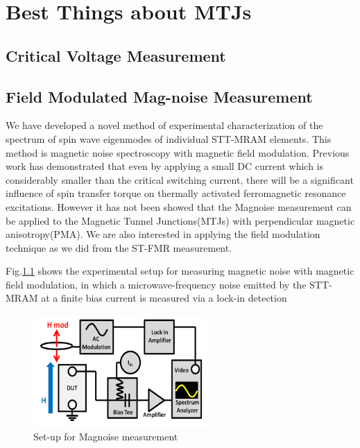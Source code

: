 \chapter{Best Things about MTJs}


\section{Critical Voltage Measurement}




\section{Field Modulated Mag-noise Measurement}



We have developed a novel method of experimental characterization of the spectrum of spin wave eigenmodes of individual STT-MRAM elements. This method is magnetic noise spectroscopy with magnetic field modulation. Previous work\cite{MagnoisePRL}\cite{Magnoise} has demonstrated that even by applying a small DC current which is considerably smaller than the critical switching current, there will be a significant influence of spin transfer torque on thermally activated ferromagnetic resonance excitations. However it has not been showed that the Magnoise measurement can be applied to the Magnetic Tunnel Junctions(MTJs) with perpendicular magnetic anisotropy(PMA). We are also interested in applying the field modulation technique as we did from the ST-FMR measurement.


Fig.\ref{fig:magnoise-setup} shows the experimental setup for measuring magnetic noise with magnetic field modulation, in which a microwave-frequency noise emitted by the STT-MRAM at a finite bias current is measured via a lock-in detection

\begin{figure}[!ht]
  \centering
  \includegraphics[width=0.6\textwidth]{fig/magnoise/Picture1.png}
   \caption{Set-up for Magnoise measurement}
  \label{fig:magnoise-setup}
\end{figure}

